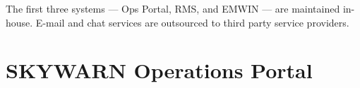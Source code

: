 \documentclass[pdflatex,letterpaper,twoside,12pt]{book}
\begin{document}
The first three systems --- Ops Portal, RMS, and EMWIN --- are maintained in-house.  E-mail and chat services are outsourced to third party service providers.

% 
% 
% 
% 
% 
% 
% 
% 


\chapter{SKYWARN Operations Portal}\label{ops-portal}
\end{document}
